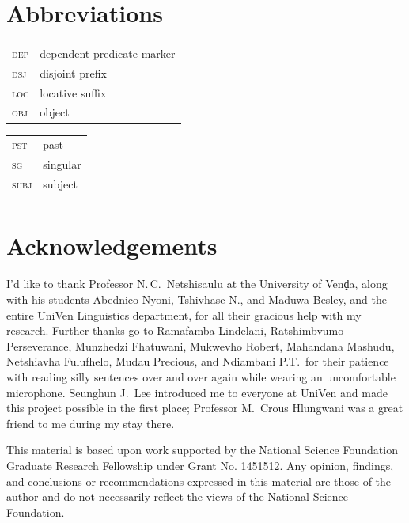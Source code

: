 \documentclass[output=paper,modfonts,nonflat,hidelinks]{langsci/langscibook}
\begin{document}
\section*{Abbreviations}
\begin{tabularx}{.6\textwidth}{lQ}
\textsc{dep} & dependent predicate marker\\ 
\textsc{dsj} & {disjoint} prefix\\
\textsc{loc} & locative suffix\\
\textsc{obj} & object\\
\end{tabularx}
\begin{tabularx}{.35\textwidth}{lQ}
\textsc{pst} & past\\
\textsc{sg} & singular\\ 
\textsc{subj} & {subject}\\
\\
\end{tabularx}

\section*{Acknowledgements}

I'd like to thank Professor N.\,C.\ Netshisaulu at the University of Venḓa,
along with his students Abednico Nyoni, Tshivhase N., and Maduwa Besley, and
the entire UniVen Linguistics department, for all their gracious help with my
 research. Further thanks go to Ramafamba Lindelani,
Ratshimbvumo Perseverance, Munzhedzi Fhatuwani, Mukwevho Robert, Mahandana
Mashudu, Netshiavha Fulufhelo, Mudau Precious, and Ndiambani P.T.\ for their
patience with reading silly sentences over and over again while wearing an
uncomfortable microphone. Seunghun J.\ Lee introduced me to everyone at UniVen
and made this project possible in the first place; Professor M.\ Crous Hlungwani
was a great friend to me during my stay there.

This material is based upon work supported by the National Science Foundation
Graduate Research Fellowship under Grant No. 1451512. Any opinion, findings,
and conclusions or recommendations expressed in this material are those of the
author and do not necessarily reflect the views of the National Science
Foundation.



{\sloppy
\printbibliography[heading=subbibliography,notkeyword=this]}
\end{document}
